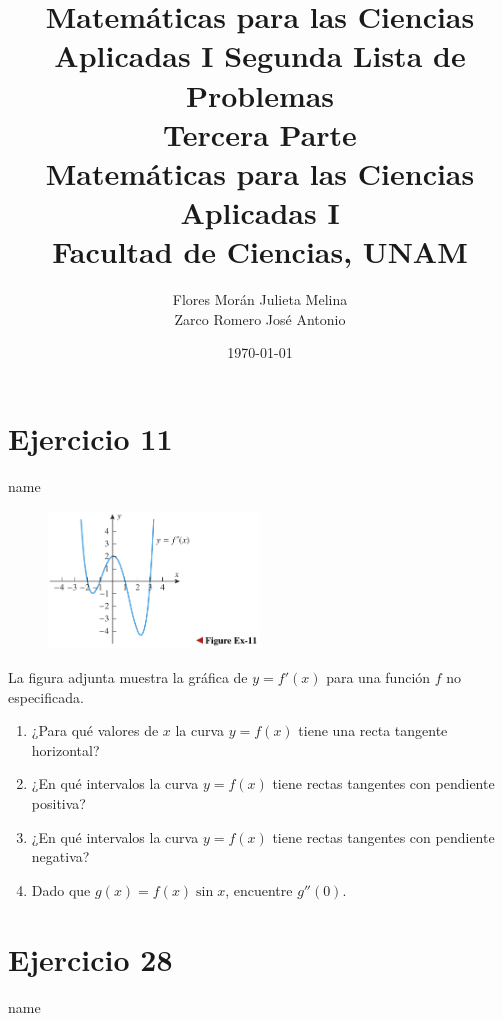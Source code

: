 \documentclass[12pt]{article}
\title{Matemáticas para las Ciencias Aplicadas I}
\title{
	Segunda Lista de Problemas \\
	\textbf{Tercera  Parte} \\
	\vspace{1ex}
	\large Matemáticas para las Ciencias Aplicadas I \\
	Facultad de Ciencias, UNAM}
\date{\today}
\author{Flores Morán Julieta Melina \\ Zarco Romero José Antonio}
\begin{document}
\maketitle


\section{Ejercicio 11} name \\

\begin{figure}[h!]
\centering
\includegraphics[width=0.5\textwidth]{../img/img_Lista2/3_11.png}
\end{figure}
La figura adjunta muestra la gráfica de $y = f'(x)$ para una función $f$ no especificada.
\begin{enumerate}[label=(\alph*)]
\item ¿Para qué valores de $x$ la curva $y = f(x)$ tiene una recta tangente horizontal?
\item ¿En qué intervalos la curva $y = f(x)$ tiene rectas tangentes con pendiente positiva?
\item ¿En qué intervalos la curva $y = f(x)$ tiene rectas tangentes con pendiente negativa?
\item Dado que $g(x) = f(x) \sin x$, encuentre $g''(0)$.
\end{enumerate}

\section{Ejercicio 28} name \\
\end{document}
